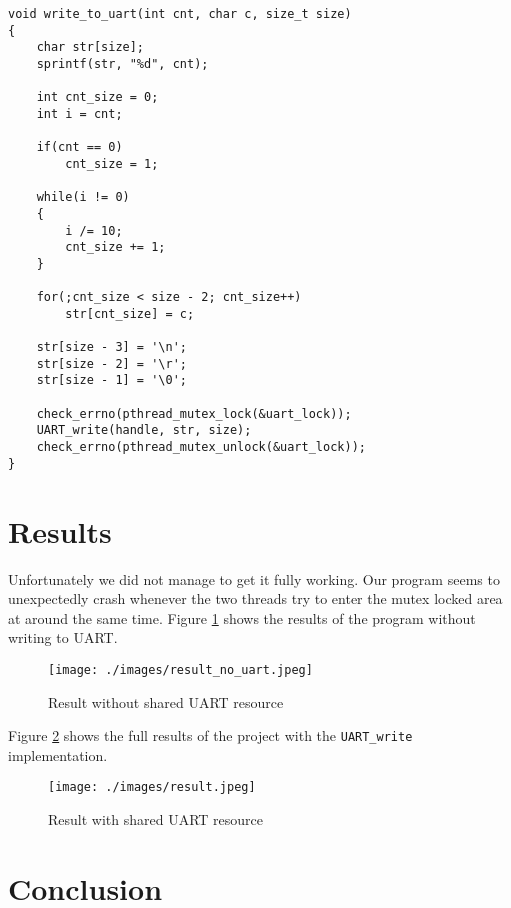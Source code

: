 \documentclass[10pt]{article}
\begin{document}
\begin{lstlisting}[style=CStyle, caption={Write to UART implementation}, captionpos=b, label={lst:uart}, escapechar=@]
void write_to_uart(int cnt, char c, size_t size)
{
    char str[size];
    sprintf(str, "%d", cnt);

    int cnt_size = 0;
    int i = cnt;

    if(cnt == 0)
        cnt_size = 1;

    while(i != 0)
    {
        i /= 10;
        cnt_size += 1;
    }

    for(;cnt_size < size - 2; cnt_size++)
        str[cnt_size] = c;

    str[size - 3] = '\n';
    str[size - 2] = '\r';
    str[size - 1] = '\0';

    check_errno(pthread_mutex_lock(&uart_lock));
    UART_write(handle, str, size);
    check_errno(pthread_mutex_unlock(&uart_lock));
}
\end{lstlisting}

\newpage

\section*{Results}

Unfortunately we did not manage to get it fully working. Our program seems to unexpectedly crash
whenever the two threads try to enter the mutex locked area at around the same time. Figure \ref{resNoUART}
shows the results of the program without writing to UART.

\begin{figure}[H]
\caption{Result without shared UART resource}
\label{resNoUART}
\centering
\texttt{[image: ./images/result\_no\_uart.jpeg]}
\end{figure}

Figure \ref{res} shows the full results of the project with the \texttt{UART\_write} implementation.

\begin{figure}[H]
\caption{Result with shared UART resource}
\label{res}
\centering
\texttt{[image: ./images/result.jpeg]}
\end{figure}
\newpage

\section*{Conclusion}
\newpage
\end{document}
